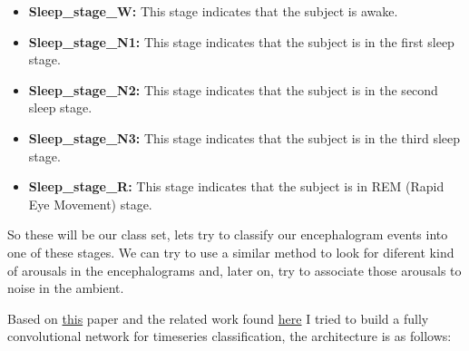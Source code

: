\begin{itemize}
  \item \textbf{Sleep\_stage\_W:} This stage indicates that the subject is awake.
  \item \textbf{Sleep\_stage\_N1:} This stage indicates that the subject is in the first sleep stage.
  \item \textbf{Sleep\_stage\_N2:} This stage indicates that the subject is in the second sleep stage.
  \item \textbf{Sleep\_stage\_N3:} This stage indicates that the subject is in the third sleep stage.
  \item \textbf{Sleep\_stage\_R:} This stage indicates that the subject is in REM (Rapid Eye Movement) stage.
\end{itemize} 

So these will be our class set, lets try to classify our encephalogram events into one of these stages. We can try to use a similar method to look for diferent kind of arousals in the encephalograms and, later on, try to associate those arousals to noise in the ambient.

Based on \href{https://arxiv.org/abs/1611.06455}{this} paper and the related work found \href{https://keras.io/examples/timeseries/eeg_signal_classification/}{here} I tried to build a fully convolutional network for timeseries classification, the architecture is as follows:

